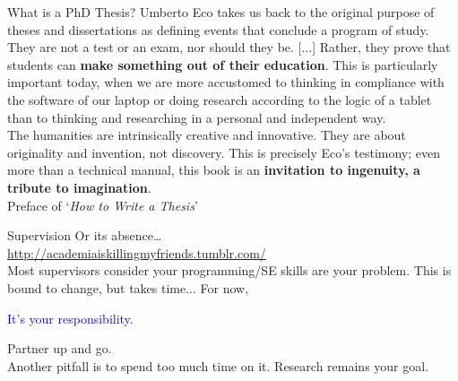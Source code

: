 \documentclass[]{beamer} %
\begin{document}
\begin{frame}{What is a  PhD Thesis?}
Umberto Eco takes us back to the original purpose of theses and dissertations as defining events that conclude a program of study. 
They are not a test or an exam, nor should they be. [...] %
Rather, they prove that students can \textbf{make something out of their education}.
This is particularly important today, when we are more accustomed to thinking in compliance with the software of 
our laptop or doing research according to the logic of a tablet than to thinking and researching in a personal and independent way.\\[2mm]

The humanities are intrinsically creative and innovative. 
They are about originality and invention, not discovery. 
This is precisely Eco's testimony; even more than a technical manual,
this book is an \textbf{invitation to ingenuity, a tribute to imagination}.\\[2mm]

Preface of `\textit{How to Write a Thesis}' 
\end{frame}


\begin{frame}{Supervision}
Or its absence\dots \\
\url{http://academiaiskillingmyfriends.tumblr.com/}\\[5mm]
\pause
Most supervisors consider your programming/SE skills are your problem. This is bound to change, but takes time... For now,
\pause
\begin{center}\textcolor{blue}{It's your responsibility.}\end{center}
\pause 
Partner up and go. \\[3mm]
\pause 
Another pitfall is to spend too much time on it. Research remains your goal.
\end{frame}
\end{document}
